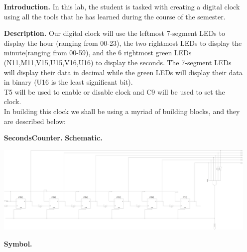 \documentclass[9pt]{article}
\begin{document}
\begin{enumerate}
   \item[\textbf{Introduction.}]  In this lab, the student is tasked with 
   creating a digital clock using all the tools that he has learned during the
   course of the semester.
   
   \item[\textbf{Description.}] Our digital clock will use the leftmost
   7-segment LEDs to display the hour (ranging from 00-23), the two 
   rightmost LEDs to display the minute(ranging from 00-59), and the
   6 rightmost green LEDs (N11,M11,V15,U15,V16,U16) to display the seconds.   
   The 7-segment LEDs will display their data in decimal while the green LEDs
   will display their data in binary (U16 is the least significant bit). \\
   
   T5 will be used to enable or disable clock and C9 will be used to set the
   clock. \\
   
   In building this clock we shall be using a myriad of building blocks, and
   they are described below:
  	\item[\textbf{SecondsCounter.}] \textbf{Schematic.}
   
             \begin{center}
                \includegraphics[width=\textwidth]{seconds_counter.png}
             \end{center}
             
             \newpage
             \textbf{Symbol.}
   

\end{enumerate}
\end{document}
